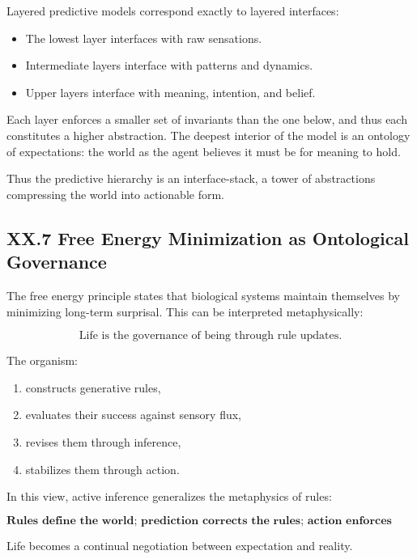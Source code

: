 \documentclass[11pt,letterpaper]{article}
\begin{document}
Layered predictive models correspond exactly to layered interfaces:

\begin{itemize}
    \item The lowest layer interfaces with raw sensations.
    \item Intermediate layers interface with patterns and dynamics.
    \item Upper layers interface with meaning, intention, and belief.
\end{itemize}

Each layer enforces a smaller set of invariants than the one below, and thus each constitutes a higher abstraction. The deepest interior of the model is an ontology of expectations: the world as the agent believes it must be for meaning to hold.

Thus the predictive hierarchy is an interface-stack, a tower of abstractions compressing the world into actionable form.

\subsection{XX.7 Free Energy Minimization as Ontological Governance}

The free energy principle states that biological systems maintain themselves by minimizing long-term surprisal. This can be interpreted metaphysically:

\[
\text{Life is the governance of being through rule updates.}
\]

The organism:

\begin{enumerate}
    \item constructs generative rules,
    \item evaluates their success against sensory flux,
    \item revises them through inference,
    \item stabilizes them through action.
\end{enumerate}

In this view, active inference generalizes the metaphysics of rules:

\[
\textbf{Rules define the world; prediction corrects the rules; action enforces them.}
\]

Life becomes a continual negotiation between expectation and reality.
\end{document}

